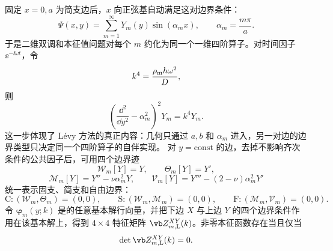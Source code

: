 固定 \(x=0,a\) 为简支边后，\(x\) 向正弦基自动满足这对边界条件：
\[
 \Psi(x,y)=\sum_{m=1}^{\infty}Y_m(y)\sin(\alpha_m x),
 \qquad \alpha_m=\frac{m\pi}{a}.
\]
于是二维双调和本征值问题对每个 \(m\) 约化为同一个一维四阶算子。对时间因子 \(\ee^{-\ii\omega t}\)，令
\[
 k^4=\frac{\rho_{\rm m} h\omega^2}{D},
\]
则
\begin{equation}
 \left(\frac{\dd^2}{\dd y^2}-\alpha_m^2\right)^2Y_m=k^4Y_m.
 \label{eq:phys-sm-levy-dynamic-ode}
\end{equation}
这一步体现了 L\'evy 方法的真正内容：几何只通过 \(a,b\) 和 \(\alpha_m\) 进入，另一对边的边界类型只决定同一个四阶算子的自伴实现。
对 \(y=\mathrm{const}\) 的边，去掉不影响齐次条件的公共因子后，可用四个边界迹
\[
 \mathcal W_m[Y]=Y,
 \qquad
 \Theta_m[Y]=Y',
\]
\[
 \mathcal M_m[Y]=Y''-\nu\alpha_m^2Y,
 \qquad
 \mathcal V_m[Y]=Y'''-(2-\nu)\alpha_m^2Y'
\]
统一表示固支、简支和自由边界：
\[
 \mathrm C:(\mathcal W_m,\Theta_m)=(0,0),\qquad
 \mathrm S:(\mathcal W_m,\mathcal M_m)=(0,0),\qquad
 \mathrm F:(\mathcal M_m,\mathcal V_m)=(0,0).
\]
令 \(\boldsymbol\varphi_m(y;k)\) 是的任意基本解行向量，并把下边 \(X\) 与上边 \(Y\) 的四个边界条件作用在该基本解上，得到 \(4\times4\) 特征矩阵 \(\vb Z_{m,\mathrm L}^{XY}(k)\)。非零本征函数存在当且仅当
\begin{equation}
 \det\vb Z_{m,\mathrm L}^{XY}(k)=0.
 \label{eq:phys-sm-levy-characteristic}
\end{equation}
